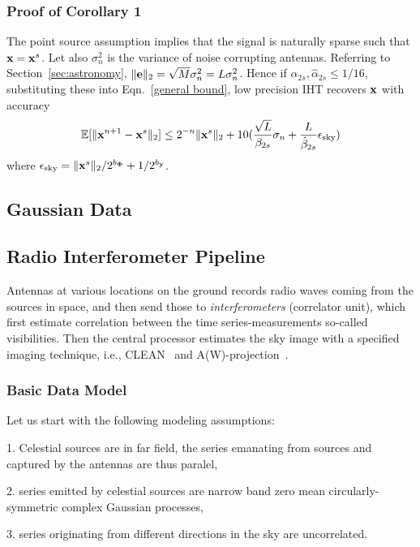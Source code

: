 \documentclass[11pt]{article}
\begin{document}
\subsubsection{Proof of Corollary 1}
The point source assumption implies that the signal is naturally sparse such that ${\bf x} = {\bf x}^s$. Let also $\sigma_n^2$ is the variance of noise corrupting antennas. Referring to Section~\ref{sec:astronomy}, $\|{\bf e} \|_2 = \sqrt{M}\sigma_n^2 = L\sigma_n^2$. Hence if $\alpha_{2s}, \hat{\alpha}_{2s}\leq 1/16$, substituting these into Eqn.~\ref{general bound}, low precision IHT recovers ${\bf x}$ with accuracy
\begin{equation}
    \mathbb{E}[\|{\bf x}^{n+1} - {\bf x}^s \|_2] \leq 2^{-n}\| {\bf x}^s\|_2 + 10(\frac{\sqrt{L}}{\beta_{2s}}\sigma_n+\frac{L}{\hat{\beta}_{2s}}\epsilon_{\rm{sky}})
\end{equation}
where $\epsilon_{\rm{sky}} =  \|{\bf x}^s \|_2/2^{b_{\bf \Phi}} + 1/2^{b_{\bf y}}$.

\subsection{Gaussian Data}
\subsection{Radio Interferometer Pipeline}
Antennas at various locations on the ground records radio waves coming from the sources in space, and then send those to {\it interferometers} (correlator unit), which first estimate correlation between the time series-measurements so-called visibilities. Then the central processor estimates the sky image with a specified imaging technique, i.e., {CLEAN}~\cite{hogbom1974clean} and A(W)-projection~\cite{bhatganar2008ra}. 
\subsubsection{Basic Data Model}

Let us start with the following modeling assumptions:~\cite{perley}

1. Celestial sources are in far field, the series emanating from sources and captured by the antennas are thus paralel,
  
2.  series emitted by celestial sources are narrow band zero mean circularly-symmetric complex Gaussian processes,
    
3.  series originating from different directions in the sky are uncorrelated.  
  
\end{document}
